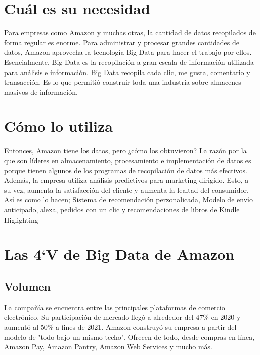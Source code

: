 \section{Cuál es su necesidad}

Para empresas como Amazon y muchas otras, la cantidad de datos recopilados de forma regular es enorme. Para administrar y procesar grandes cantidades de datos, Amazon aprovecha la tecnología Big Data para hacer el trabajo por ellos. Esencialmente, Big Data es la recopilación a gran escala de información utilizada para análisis e información. Big Data recopila cada clic, me gusta, comentario y transacción. Es lo que permitió construir toda una industria sobre almacenes masivos de información.

\clearpage
\section{Cómo lo utiliza}
Entonces, Amazon tiene los datos, pero ¿cómo los obtuvieron? La razón por la que son líderes en almacenamiento, procesamiento e implementación de datos es porque tienen algunos de los programas de recopilación de datos más efectivos. Además, la empresa utiliza análisis predictivos para marketing dirigido. Esto, a su vez, aumenta la satisfacción del cliente y aumenta la lealtad del consumidor. Así es como lo hacen; Sistema de recomendación perzonalicada, Modelo de envío anticipado, alexa, pedidos con un clic y recomendaciones de libros de Kindle Higlighting

\clearpage
\section{Las 4`V de Big Data de Amazon }
\subsection{Volumen}
La compañía se encuentra entre las principales plataformas de comercio electrónico. Su participación de mercado llegó a alrededor del 47$\%$ en 2020 y aumentó al 50$\%$ a fines de 2021. Amazon construyó su empresa a partir del modelo de "todo bajo un mismo techo". Ofrecen de todo, desde compras en línea, Amazon Pay, Amazon Pantry, Amazon Web Services y mucho más.


